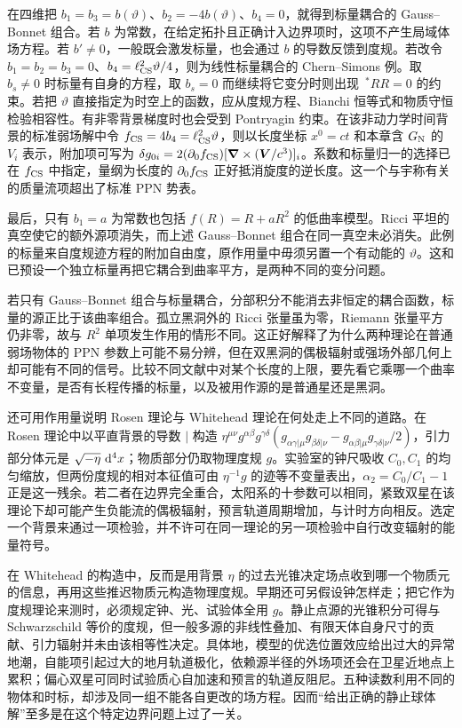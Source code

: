 在四维把 $b_1=b_3=b(\vartheta)$、$b_2=-4b(\vartheta)$、$b_4=0$，就得到标量耦合的 Gauss--Bonnet 组合。若 $b$ 为常数，在给定拓扑且正确计入边界项时，这项不产生局域体场方程。若 $b'\ne0$，一般既会激发标量，也会通过 $b$ 的导数反馈到度规。若改令 $b_1=b_2=b_3=0$、$b_4=\ell_{\rm CS}^2\vartheta/4$，则为线性标量耦合的 Chern--Simons 例。取 $b_s\ne0$ 时标量有自身的方程，取 $b_s=0$ 而继续将它变分时则出现 $\,{}^*RR=0$ 的约束。若把 $\vartheta$ 直接指定为时空上的函数，应从度规方程、Bianchi 恒等式和物质守恒检验相容性。有非零背景梯度时也会受到 Pontryagin 约束。在该非动力学时间背景的标准弱场解中令 $f_{\rm CS}=4b_4=\ell_{\rm CS}^2\vartheta$，则以长度坐标 $x^0=ct$ 和本章含 $G_{\rm N}$ 的 $V_i$ 表示，附加项可写为 $\delta g_{0i}=2(\partial_0 f_{\rm CS})[\bm\nabla\times(\bm V/c^3)]_i$。系数和标量归一的选择已在 $f_{\rm CS}$ 中指定，量纲为长度的 $\partial_0 f_{\rm CS}$ 正好抵消旋度的逆长度。这一个与宇称有关的质量流项超出了标准 PPN 势表。

最后，只有 $b_1=a$ 为常数也包括 $f(R)=R+aR^2$ 的低曲率模型。Ricci 平坦的真空使它的额外源项消失，而上述 Gauss--Bonnet 组合在同一真空未必消失。此例的标量来自度规迹方程的附加自由度，原作用量中毋须另置一个有动能的 $\vartheta$。这和已预设一个独立标量再把它耦合到曲率平方，是两种不同的变分问题。

若只有 Gauss--Bonnet 组合与标量耦合，分部积分不能消去非恒定的耦合函数，标量的源正比于该曲率组合。孤立黑洞外的 Ricci 张量虽为零，Riemann 张量平方仍非零，故与 $R^2$ 单项发生作用的情形不同。这正好解释了为什么两种理论在普通弱场物体的 PPN 参数上可能不易分辨，但在双黑洞的偶极辐射或强场外部几何上却可能有不同的信号。比较不同文献中对某个长度的上限，要先看它乘哪一个曲率不变量，是否有长程传播的标量，以及被用作源的是普通星还是黑洞。

还可用作用量说明 Rosen 理论与 Whitehead 理论在何处走上不同的道路。在 Rosen 理论中以平直背景的导数 $|$ 构造 $\eta^{\mu\nu} g^{\alpha\beta}g^{\gamma\delta}
(g_{\alpha\gamma|\mu}g_{\beta\delta|\nu}-g_{\alpha\beta|\mu}g_{\gamma\delta|\nu}/2)$，引力部分体元是 $\sqrt{-\eta}\,\dd[4]{x}$；物质部分仍取物理度规 $g$。实验室的钟尺吸收 $C_0,C_1$ 的均匀缩放，但两份度规的相对本征值可由 $\eta^{-1}g$ 的迹等不变量表出，$\alpha_2=C_0/C_1-1$ 正是这一残余。若二者在边界完全重合，太阳系的十参数可以相同，紧致双星在该理论下却可能产生负能流的偶极辐射，预言轨道周期增加，与计时方向相反。选定一个背景来通过一项检验，并不许可在同一理论的另一项检验中自行改变辐射的能量符号。

在 Whitehead 的构造中，反而是用背景 $\eta$ 的过去光锥决定场点收到哪一个物质元的信息，再用这些推迟物质元构造物理度规。早期还可另假设钟怎样走；把它作为度规理论来测时，必须规定钟、光、试验体全用 $g$。静止点源的光锥积分可得与 Schwarzschild 等价的度规，但一般多源的非线性叠加、有限天体自身尺寸的贡献、引力辐射并未由该相等性决定。具体地，模型的优选位置效应给出过大的异常地潮，自能项引起过大的地月轨道极化，依赖源半径的外场项还会在卫星近地点上累积；偏心双星可同时试验质心自加速和预言的轨道反阻尼。五种读数利用不同的物体和时标，却涉及同一组不能各自更改的场方程。因而“给出正确的静止球体解”至多是在这个特定边界问题上过了一关。

